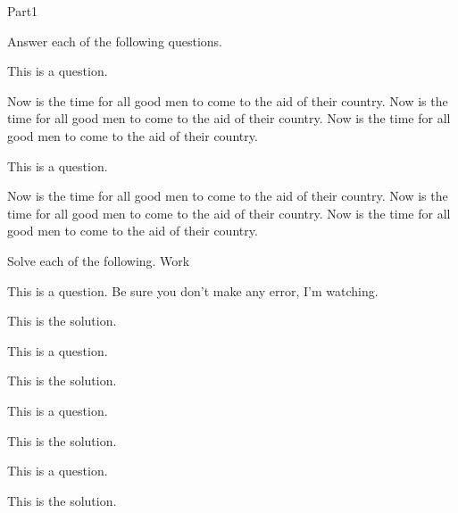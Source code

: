 \documentclass[10pt]{article}
\begin{document}
\begin{exam}[Part I.]{Part1}

\begin{problem*}[10ea]
Answer each of the following questions.
\begin{parts}
\item This is a question.
\begin{solution}[1in]
Now is the time for all good men to come to the aid of their country.
Now is the time for all good men to come to the aid of their country.
Now is the time for all good men to come to the aid of their country.
\end{solution}
\item This is a question.
\begin{solution}[1in]
Now is the time for all good men to come to the aid of their country.
Now is the time for all good men to come to the aid of their country.
Now is the time for all good men to come to the aid of their country.
\end{solution}
\end{parts}
\end{problem*}


\begin{problem*}[12]
Solve each of the following. Work \OnBackOfPage
\begin{multicols}{2}

\def\solnsp{1in}

\begin{parts}
\item This is a question.  Be sure you don't make any error, I'm watching.

\begin{solution}[\solnsp]
This is the solution.
\end{solution}

\item This is a question.
\begin{solution}[\solnsp]
This is the solution.
\end{solution}

\item This is a question.
\begin{solution}[\solnsp]
This is the solution.
\end{solution}

\item This is a question.
\begin{solution}[\solnsp]
This is the solution.
\end{solution}
\end{parts}
\end{multicols}
\end{problem*}

\end{exam}
\end{document}
